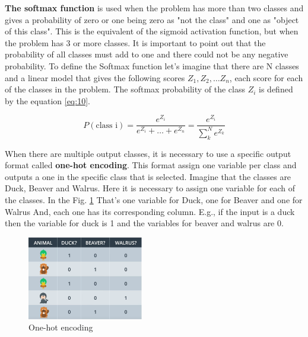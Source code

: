 \documentclass{article}
\begin{document}
\textbf{The softmax function} is used when the problem has more than two classes and gives a probability of zero or one being zero as "not the class" and one as "object of this class". This is the equivalent of the sigmoid activation function, but when the problem has 3 or more classes. It is important to point out that the probability of all classes must add to one and there could not be any negative probability. To define the Softmax function let's imagine that there are N classes and a linear model that gives the following scores \( Z_1, Z_2, \dots Z_n\), each score for each of the classes in the problem. The softmax probability of the class \(Z_i\) is defined by the equation \eqref{eq:10}.

\begin{equation}
\label{eq:10}
P(\text{class i}) = \frac{e^{Z_i}}{e^{Z_i} + \dots + e^{Z_n}}  = \frac{e^{Z_i}}{\sum_k^N e^{Z_k}}
\end{equation} 

When there are multiple output classes, it is necessary to use a specific output format called \textbf{one-hot encoding}. This format assign one variable per class and outputs a one in the specific class that is selected.  Imagine that the classes are Duck, Beaver and Walrus. Here it is necessary to assign one variable for each of the classes. In the Fig. \ref{fig:f21} That's one variable for Duck, one for Beaver and one for Walrus And, each one has its corresponding column. E.g., if the input is a duck then the variable for duck is 1 and the variables for beaver and walrus are 0.

\begin{figure}[ht]
    \centering
    \includegraphics[width=0.45\textwidth,height=0.45\textheight,keepaspectratio]{images/one_hot.png}
    \captionsetup{justification=centering}
    \caption{One-hot encoding}
    \label{fig:f21}
\end{figure}
\end{document}
